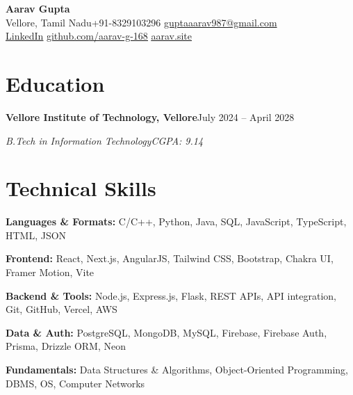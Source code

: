 \documentclass[letterpaper,11pt]{article}
\newcommand{\entry}[4]{%
  \textbf{#1}\hfill #2\par
  \textit{#3}\hfill\textit{#4}\par}
\begin{document}
\fontsize{10.5}{12}\selectfont

\begin{center}
  {\fontsize{25}{28}\selectfont\bfseries Aarav Gupta}\\[3pt]
  Vellore, Tamil Nadu\enspace\textbar\enspace +91-8329103296\enspace\textbar\enspace
  \href{mailto:guptaaarav987@gmail.com}{guptaaarav987@gmail.com}\\[2pt]
  \href{https://www.linkedin.com/in/aarav-gupta-a1120526a/}{\underline{LinkedIn}}\enspace\textbar\enspace
  \href{https://github.com/aarav-g-168}{\underline{github.com/aarav-g-168}}\enspace\textbar\enspace
  \href{https://aarav.site}{\underline{aarav.site}}
\end{center}
\vspace{-7pt}

\section{Education}
\entry{Vellore Institute of Technology, Vellore}{July 2024 -- April 2028}
  {B.Tech in Information Technology}{CGPA: 9.14}

\section{Technical Skills}
\textbf{Languages \& Formats:} C/C++, Python, Java, SQL, JavaScript, TypeScript, HTML, JSON\par
\textbf{Frontend:} React, Next.js, AngularJS, Tailwind CSS, Bootstrap, Chakra UI, Framer Motion, Vite\par
\textbf{Backend \& Tools:} Node.js, Express.js, Flask, REST APIs, API integration, Git, GitHub, Vercel, AWS\par
\textbf{Data \& Auth:} PostgreSQL, MongoDB, MySQL, Firebase, Firebase Auth, Prisma, Drizzle ORM, Neon\par
\textbf{Fundamentals:} Data Structures \& Algorithms, Object-Oriented Programming, DBMS, OS, Computer Networks
\end{document}
